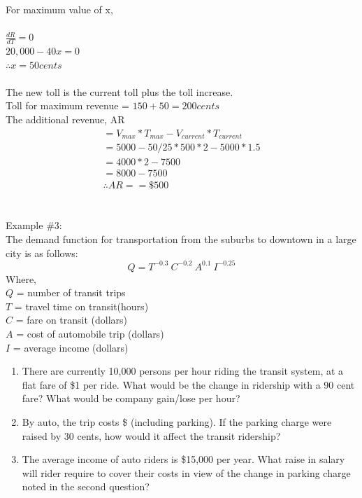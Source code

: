 For maximum value of x,\\\\
$\frac{dR}{dT} = 0$\\
$20,000 -40x = 0$\\
$\therefore x = 50 cents$\\\\
The new toll is the current toll plus the toll increase.\\
Toll for maximum revenue = $150 +50 = 200cents$\\
The additional revenue, AR
\begin{gather*}
	= V_{max} *  T_{max} - V_{current} * T_{current}\\
	= {5000 - 50/25 * 500} * 2 - 5000 * 1.5\\
	= 4000 *2 - 7500\\
	= 8000 - 7500\\
	\therefore AR = =\$500
\end{gather*}\\\\
Example \#3:\\
The demand function for transportation from the suburbs to downtown in a large city is as follows:
$$ Q = T^{-0.3}\: C^{-0.2} \: A^{0.1} \: I^{-0.25} $$
Where,\\
\hspace*{10mm} $Q$ = number of transit trips\\
\hspace*{10mm} $T$ = travel time on transit(hours)\\
\hspace*{10mm} $C$ = fare on transit (dollars)\\
\hspace*{10mm} $A$ = cost of automobile trip (dollars)\\
\hspace*{10mm} $I$ = average income (dollars)
\begin{enumerate}
	\item There are currently 10,000 persons per hour riding the transit system, at a flat fare of \$1 per ride. What would be the change in ridership with a 90 cent fare? What would be company gain/lose per hour?
	\item By auto, the trip costs \$ (including parking). If the parking charge were raised by 30 cents, how would it affect the transit ridership?
	\item The average income of auto riders is \$15,000 per year. What raise in salary will rider require to cover their costs in view of the change in parking charge noted in the second question?
\end{enumerate}
